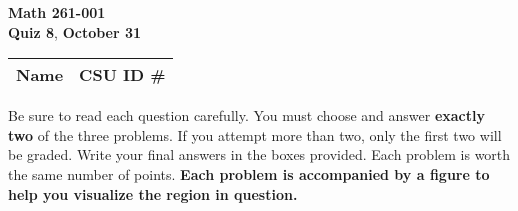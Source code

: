 \documentclass[12pt]{exam}
\newcommand{\class}{Math 261-001} %
\newcommand{\examnum}{Quiz 8} %
\newcommand{\examdate}{October 31} %
\begin{document}
\pagestyle{plain}
\thispagestyle{empty}

\noindent
\textbf{\class}\\
\textbf{\examnum}, \textbf{\examdate} \\



\setlength{\tabcolsep}{3.5cm} %
\renewcommand{\arraystretch}{1.5}
\setlength\extrarowheight{1cm}
\begin{tabular}{ |c|c| } 
 \hline
 Name   & CSU ID \#  \\ 
 \hline
\end{tabular}
\vspace{10pt}
\iffalse

    \foreach \s in {1,...,5}{
          \choice $P_\s$ has no power 
     }%
\fi

Be sure to read each question carefully. You must choose and answer \textbf{exactly two} of the three problems.  
If you attempt more than two, only the first two will be graded.  
Write your final answers in the boxes provided. Each problem is worth the same number of points.  
\textbf{Each problem is accompanied by a figure to help you visualize the region in question.}  
\end{document}
